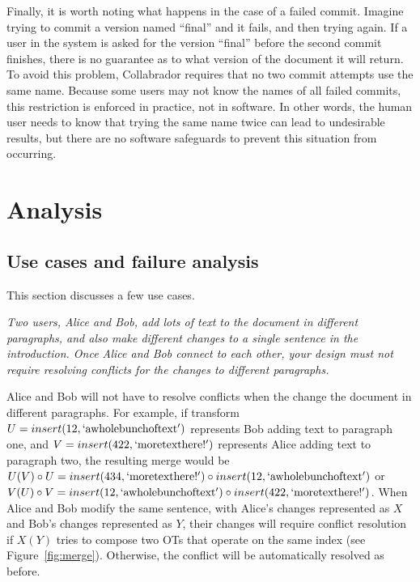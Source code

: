 \documentclass[11pt,titlepage]{article}
\begin{document}
Finally, it is worth noting what happens in the case of a failed
commit. Imagine trying to commit a version named ``final'' and it
fails, and then trying again. If a user in the system is asked for the
version ``final'' before the second commit finishes, there is no
guarantee as to what version of the document it will return. To avoid
this problem, Collabrador requires that no two commit attempts use the
same name. Because some users may not know the names of all failed
commits, this restriction is enforced in practice, not in software. In
other words, the human user needs to know that trying the same name
twice can lead to undesirable results, but there are no software
safeguards to prevent this situation from occurring.

\section{Analysis}

\subsection{Use cases and failure analysis}

This section discusses a few use cases.

\emph{Two users, Alice and Bob, add lots of text to the document in
  different paragraphs, and also make different changes to a single
  sentence in the introduction. Once Alice and Bob connect to each
  other, your design must not require resolving conflicts for the
  changes to different paragraphs.}

Alice and Bob will not have to resolve conflicts when the change the
document in different paragraphs. For example, if transform $U =
insert(12, \mathrm{`a whole bunch of text'})$ represents Bob adding
text to paragraph one, and $V = insert(422, \mathrm{`more text
  here!'})$ represents Alice adding text to paragraph two, the
resulting merge would be $U(V)\circ U = insert(434, \mathrm{`more text
  here!'})\circ insert(12, \mathrm{`a whole bunch of text'})$ or
$V(U)\circ V = insert(12, \mathrm{`a whole bunch of text'})\circ
insert(422, \mathrm{`more text here!'})$.  When Alice and Bob modify
the same sentence, with Alice's changes represented as $X$ and Bob's
changes represented as $Y$, their changes will require conflict
resolution if $X(Y)$ tries to compose two OTs that operate on the same
index (see Figure~\ref{fig:merge}). Otherwise, the conflict will be
automatically resolved as before.
\end{document}
